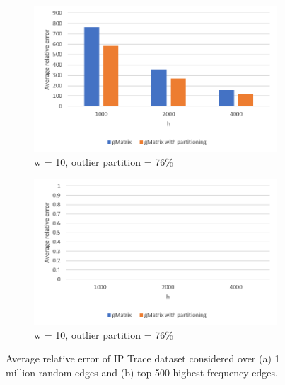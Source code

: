 \begin{figure}[!htbp]
\centering
\begin{subfigure}{.5\textwidth}
  \centering
  \includegraphics[width=1\linewidth]{I2}
  \caption{w = 10, outlier partition = 76\%}
  \label{fig:sub1}
\end{subfigure}%
\begin{subfigure}{.5\textwidth}
  \centering
  \includegraphics[width=1\linewidth]{I2T}
  \caption{w = 10, outlier partition = 76\%}
  \label{fig:sub2}
\end{subfigure}
\caption{Average relative error of IP Trace dataset considered over (a) 1 million random edges and (b) top 500 highest frequency edges.}
\label{fig:i2}
\end{figure}


